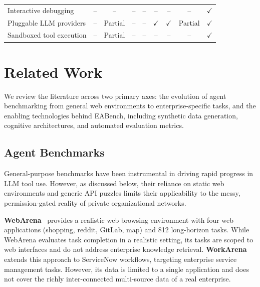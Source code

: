 \documentclass[journal,dvipsnames]{acmart}
\begin{document}
\begin{table}
{\begin{tabular}{p{3.8cm}cccccccc}
Interactive debugging                 & --            & --             & --             & --             & --             & --             & --             & $\checkmark$ \\
Pluggable LLM providers               & --            & Partial        & --             & --             & $\checkmark$   & $\checkmark$   & Partial        & $\checkmark$ \\
Sandboxed tool execution              & --            & Partial        & --             & --             & --             & --             & --             & $\checkmark$ \\
\bottomrule
\end{tabular}
}%
\end{table}


\section{Related Work}
\label{sec:related}

We review the literature across two primary axes: the evolution of agent benchmarking from general web environments to enterprise-specific tasks, and the enabling technologies behind EABench, including synthetic data generation, cognitive architectures, and automated evaluation metrics.

\subsection{Agent Benchmarks}

General-purpose benchmarks have been instrumental in driving rapid progress in LLM tool use. However, as discussed below, their reliance on static web environments and generic API puzzles limits their applicability to the messy, permission-gated reality of private organizational networks.

\textbf{WebArena}~\cite{zhou2023webarena} provides a realistic web browsing
environment with four web applications (shopping, reddit, GitLab, map) and 812
long-horizon tasks.  While WebArena evaluates task completion in a realistic
setting, its tasks are scoped to web interfaces and do not address enterprise
knowledge retrieval.  \textbf{WorkArena}~\cite{drouin2024workarena} extends
this approach to ServiceNow workflows, targeting enterprise service management
tasks.  However, its data is limited to a single application and does not cover
the richly inter-connected multi-source data of a real enterprise.
\end{document}
